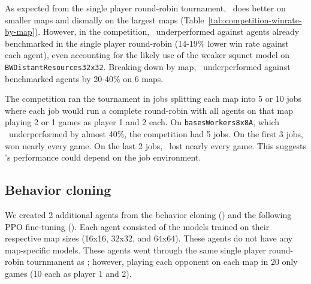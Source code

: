 \documentclass{article}
\begin{document}
As expected from the single player round-robin tournament, \agentName\ does better on
smaller maps and dismally on the largest maps
(Table~\ref{tab:competition-winrate-by-map}). However, in the competition, \agentName\
underperformed against agents already benchmarked in the single player round-robin
(14-19\% lower win rate against each agent), even accounting for the likely use of
the weaker squnet model on \texttt{BWDistantResources32x32}.  Breaking down by map, 
\agentName\ underperformed against benchmarked agents by 20-40\% on 6 maps.

The competition ran the tournament in jobs splitting each map into 5 or 10 jobs where
each job would run a complete round-robin with all agents on that map playing 2 or 1
games as player 1 and 2 each. On \texttt{basesWorkers8x8A}, which \agentName\
underperformed by almost 40\%, the competition had 5 jobs. On the first 3 jobs,
\agentName won nearly every game. On the last 2 jobs, \agentName\ lost nearly every
game. This suggests \agentName's performance could depend on the job environment.

\subsection{Behavior cloning}
We created 2 additional agents from the behavior cloning (\bcAgent) and the following
PPO fine-tuning (\bcPPOAgent). Each agent consisted of the models trained on their
respective map sizes (16x16, 32x32, and 64x64). These agents do not have any
map-specific models. These agents went through the same single player round-robin
tournmanent as \agentName; however, playing each opponent on each map in 20 only games
(10 each as player 1 and 2).
\end{document}
